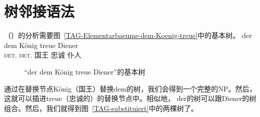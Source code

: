 \section{树邻接语法}

（）的分析需要图~\vref{TAG-Elementarbaeume-dem-Koenig-treue}中的基本树。
\ea
\gll der        dem        König treue Diener\\
     \textsc{det}.\nom{} \textsc{det}.\dat{} 国王  忠诚 仆人\\
\z

\begin{figure}
\hfill
{}
\hfill
{}
\hfill
{}
%
\hfill
%
%
\hfill
%
\hfill\mbox{}
\caption{\label{TAG-Elementarbaeume-dem-Koenig-treue}“der dem König treue Diener”的基本树}
\end{figure}%

\noindent
通过在替换节点König（国王）替换dem的树，我们会得到一个完整的NP。然后，这就可以插进treue（忠诚的）的替换节点中。相似地， der的树可以跟Diener的树组合。然后，我们就得到图~\vref{TAG-substituiert}中的两棵树了。

